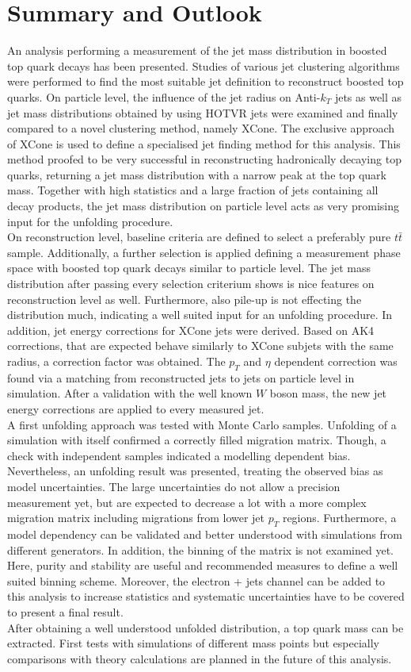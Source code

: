 \chapter{Summary and Outlook}
	An analysis performing a measurement of the jet mass distribution in boosted top quark decays has been presented. Studies of various jet clustering algorithms were performed to find the most suitable jet definition to reconstruct boosted top quarks. On particle level, the influence of the jet radius on Anti-$k_T$ jets as well as jet mass distributions obtained by using HOTVR jets were examined and finally compared to a novel clustering method, namely XCone. The exclusive approach of XCone is used to define a specialised jet finding method for this analysis. This method proofed to be very successful in reconstructing hadronically decaying top quarks, returning a jet mass distribution with a narrow peak at the top quark mass. Together with high statistics and a large fraction of jets containing all decay products, the jet mass distribution on particle level acts as very promising input for the unfolding procedure. \\
	On reconstruction level, baseline criteria are defined to select a preferably pure $t\bar{t}$ sample. Additionally, a further selection is applied defining a measurement phase space with boosted top quark decays similar to particle level. The jet mass distribution after passing every selection criterium shows is nice features on reconstruction level as well. Furthermore, also pile-up is not effecting the distribution much, indicating a well suited input for an unfolding procedure. In addition, jet energy corrections for XCone jets were derived. Based on AK4 corrections, that are expected behave similarly to XCone subjets with the same radius, a correction factor was obtained. The $p_T$ and $\eta$ dependent correction was found via a matching from reconstructed jets to jets on particle level in simulation. After a validation with the well known $W$ boson mass, the new jet energy corrections are applied to every measured jet.\\	
	A first unfolding approach was tested with Monte Carlo samples. Unfolding of a simulation with itself confirmed a correctly filled migration matrix. Though, a check with independent samples indicated a modelling dependent bias. Nevertheless, an unfolding result was presented, treating the observed bias as model uncertainties. The large uncertainties do not allow a precision measurement yet, but are expected to decrease a lot with a more complex migration matrix including migrations from lower jet $p_T$ regions. Furthermore, a model dependency can be validated and better understood with simulations from different generators. In addition, the binning of the matrix is not examined yet. Here, purity and stability are useful and recommended measures to define a well suited binning scheme. Moreover, the electron + jets channel can be added to this analysis to increase statistics and systematic uncertainties have to be covered to present a final result. \\
	After obtaining a well understood unfolded distribution, a top quark mass can be extracted. First tests with simulations of different mass points but especially comparisons with theory calculations are planned in the future of this analysis.
